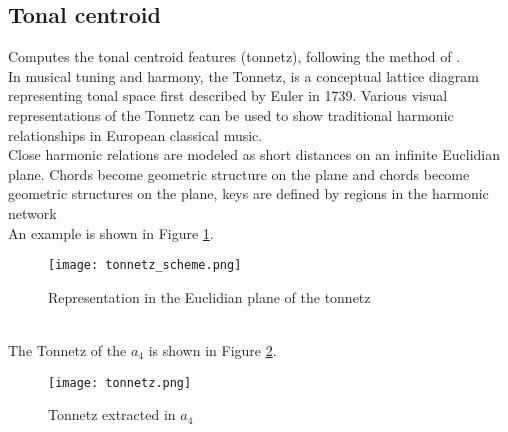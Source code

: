 \subsection{Tonal centroid}
Computes the tonal centroid features (tonnetz), following the method of \cite{harte2006detecting}.
\\
In musical tuning and harmony, the Tonnetz, is a conceptual lattice diagram representing tonal space first described by Euler in 1739. Various visual representations of the Tonnetz can be used to show traditional harmonic relationships in European classical music.
\\
Close harmonic relations are modeled as short distances on an infinite Euclidian plane. Chords become geometric structure on the plane and chords become geometric structures on the plane, keys are defined by regions in the harmonic network
\\
An example is shown in Figure \ref{fig:tonnetz_scheme}.
\begin{figure}[h]
    \centering
    \texttt{[image: tonnetz\_scheme.png]} 
	\caption{Representation in the Euclidian plane of the tonnetz}
    \label{fig:tonnetz_scheme}
\end{figure}
\\
The Tonnetz of the $a_4$ is shown in Figure \ref{fig:tonnetz}.
\\
\begin{figure}[h]
    \centering
    \texttt{[image: tonnetz.png]} 
	\caption{Tonnetz extracted in $a_4$}
    \label{fig:tonnetz}
\end{figure}

\newpage
